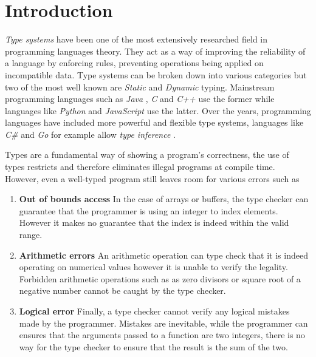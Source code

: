 \documentclass[a4paper,12pt]{report}
\begin{document}
\pagestyle{empty}
\singlespacing

\onehalfspacing

\singlespacing

\singlespacing


\setcounter{page}{0}
\pagestyle{plain}
\tableofcontents
\listoffigures

\onehalfspacing


\chapter{Introduction}
\setcounter{page}{1} 

\textit{Type systems} \cite{typesystem} have been one of the most extensively 
researched field in programming languages theory. They act as a way of 
improving the reliability of a 
language by enforcing rules, preventing operations being applied on 
incompatible data. Type systems can be broken down into various categories but 
two of the most well known are \textit{Static} \cite{staticTyping} and 
\textit{Dynamic} \cite{dynamicTyping} typing. Mainstream programming 
languages such as \textit{Java} \cite{java}, \textit{C} \cite{c} and \textit{C++} \cite{cpp} 
use the former while languages like \textit{Python} \cite{python} and 
\textit{JavaScript} \cite{js} use the latter. 
Over the years, programming languages have included more powerful and flexible 
type systems, languages like \textit{C\#} \cite{cSharp} and \textit{Go} 
\cite{goInferenceType} for example allow \textit{type inference} \cite{inferenceType}.

\par
Types are a fundamental way of showing a program's correctness, the use of types 
restricts and therefore eliminates illegal programs at compile time. However, 
even a well-typed program still leaves room for various errors such as 
\begin{enumerate}
  \item {\textbf{Out of bounds access}} In the case of arrays or buffers, the type checker 
  can guarantee that the programmer is using an integer to index elements. 
  However it makes no guarantee that the index is indeed within the valid range. 
  \item {\textbf{Arithmetic errors}} An arithmetic operation can type check that it is 
  indeed operating on numerical values however it is unable to verify the 
  legality. Forbidden arithmetic operations such as as zero divisors or square 
  root of a negative number cannot be caught by the type checker. 
  \item {\textbf{Logical error}} Finally, a type checker cannot verify any logical 
  mistakes made by the programmer. Mistakes are inevitable, while the programmer 
  can ensures that the arguments passed to a function are two integers, there is 
  no way for the type checker to ensure that the result is the sum of the two. 
\end{enumerate}
\end{document}

